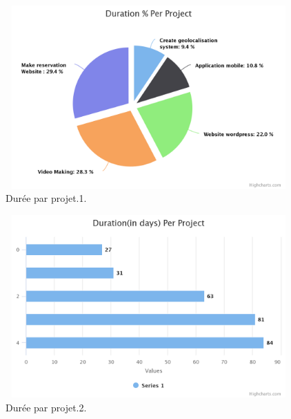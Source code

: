\begin{figure}[H]
\center
\includegraphics[width=11cm,height=7cm]{./figures/pres/duration-per-project.png}
\caption{Dur\'{e}e par projet.1. }
\end{figure}



\begin{figure}[H]
\center
\includegraphics[width=11cm,height=7cm]{./figures/pres/durationin-days-per-proj.png}
\caption{Dur\'{e}e par projet.2.}
\end{figure}










